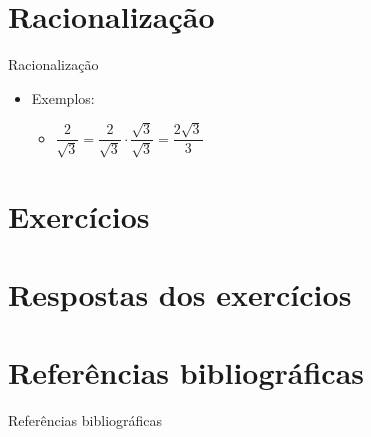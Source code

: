 \documentclass[14pt, aspectratio=169]{beamer}
\begin{document}
\section{Racionalização}

\begin{frame}[allowframebreaks]{Racionalização}

\begin{itemize}
    \item Exemplos:
    \begin{itemize}
        \item $\dfrac{2}{\sqrt{3}} = \dfrac{2}{\sqrt{3}} \cdot \dfrac{\sqrt{3}}{\sqrt{3}} = \dfrac{2\sqrt{3}}{3}$
    \end{itemize}
    
\end{itemize}
    
\end{frame}

\section{Exercícios}

\section{Respostas dos exercícios}

\section{Referências bibliográficas}

\begin{frame}{Referências bibliográficas}
    
\end{frame}
\end{document}
